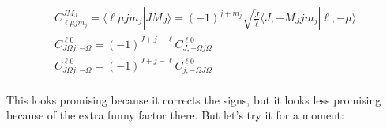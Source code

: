 \documentclass[prl, longbibliography]{revtex4-2}
\begin{document}
\begin{equation}
\begin{split}
C_{\ell \mu j m_j}^{J M_J} = \langle\ell \mu j m_j |J M_J \rangle = (-1)^{j+m_j}\sqrt{\frac{\breve{J}}{\breve{\ell}}}\langle J, -M_J j m_j |\ell, -\mu \rangle\\
C_{J\Omega j,-\Omega}^{\ell 0} = (-1)^{J+j-\ell}C_{J,-\Omega j\Omega}^{\ell 0}\\
C_{J\Omega j,-\Omega}^{\ell 0} = (-1)^{J+j-\ell}C_{j,-\Omega J\Omega}^{\ell 0}\\
\end{split}
\end{equation}

This looks promising because it corrects the signs, but it looks less promising because of the extra funny factor there. But let's try it for a moment:
\end{document}

